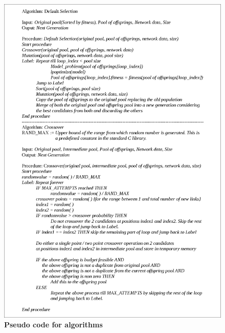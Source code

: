 \documentclass[a4paper, 12pt]{article}
\begin{document}
\begin{figure}[htbp]
\hspace*{-0.10in}
\includegraphics[scale=0.85]{./diagram2.eps}
\caption{\textbf{Pseudo code for algorithms}}
\label{fig 3}
\end{figure}
\clearpage
\clearpage
\end{document}
